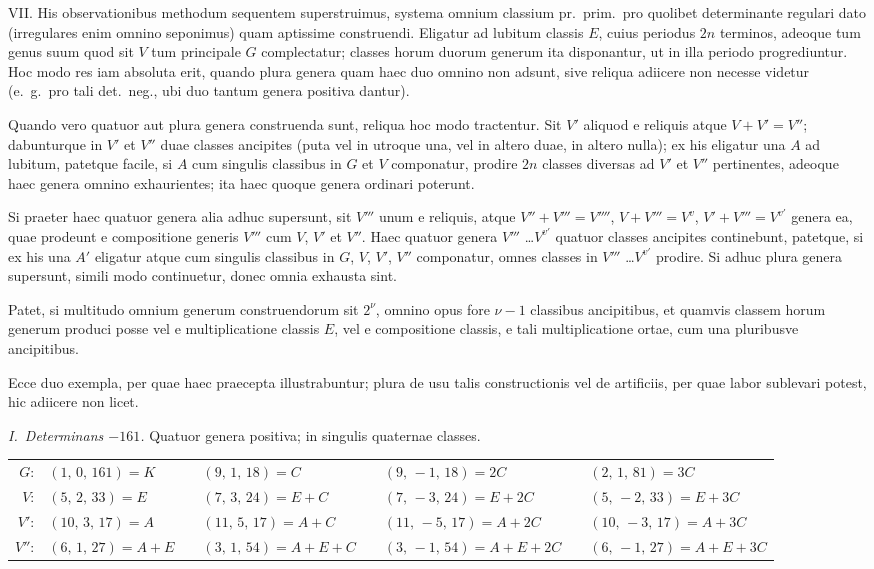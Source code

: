 \documentclass[12pt,a4paper]{article}
\theoremstyle{plain}
\theoremstyle{definition}
\theoremstyle{remark}
\begin{document}
\textsc{VII.} His observationibus methodum sequentem superstruimus, systema omnium classium pr.~prim.~pro quolibet determinante regulari dato (irregulares enim omnino seponimus) quam aptissime construendi. Eligatur ad lubitum classis $E$, cuius periodus $2n$ terminos, adeoque tum genus suum quod sit $V$ tum principale $G$ complectatur; classes horum duorum generum ita disponantur, ut in illa periodo progrediuntur. Hoc modo res iam absoluta erit, quando plura genera quam haec duo omnino non adsunt, sive reliqua adiicere non necesse videtur (e.~g.~pro tali det.~neg., ubi duo tantum genera positiva dantur).

Quando vero quatuor aut plura genera construenda sunt, reliqua hoc modo tractentur. Sit $V'$ aliquod e reliquis atque $V+V' = V''$; dabunturque in $V'$ et $V''$ duae classes ancipites (puta vel in utroque una, vel in altero duae, in altero nulla); ex his eligatur una $A$ ad lubitum, patetque facile, si $A$ cum singulis classibus in $G$ et $V$ componatur, prodire $2n$ classes diversas ad $V'$ et $V''$ pertinentes, adeoque haec genera omnino exhaurientes; ita haec quoque genera ordinari poterunt.

Si praeter haec quatuor genera alia adhuc supersunt, sit $V'''$ unum e reliquis, atque $V''+V''' = V''''$, $V+V''' = V^{v}$, $V'+V''' = V^{v'}$ genera ea, quae prodeunt e compositione generis $V'''$ cum $V$, $V'$ et $V''$. Haec quatuor genera $V'''$ \ldots $V^{v'}$ quatuor classes ancipites continebunt, patetque, si ex his una $A'$ eligatur atque cum singulis classibus in $G$, $V$, $V'$, $V''$ componatur, omnes classes in $V'''$ \ldots $V^{v'}$ prodire. Si adhuc plura genera supersunt, simili modo continuetur, donec omnia exhausta sint.

Patet, si multitudo omnium generum construendorum sit $2^\nu$, omnino opus fore $\nu-1$ classibus ancipitibus, et quamvis classem horum generum produci posse vel e multiplicatione classis $E$, vel e compositione classis, e tali multiplicatione ortae, cum una pluribusve ancipitibus.

Ecce duo exempla, per quae haec praecepta illustrabuntur; plura de usu talis constructionis vel de artificiis, per quae labor sublevari potest, hic adiicere non licet.

\textit{I.~Determinans $-161$.} Quatuor genera positiva; in singulis quaternae classes.

\begin{center}
\begin{tabular}{r@{\,}l@{\qquad}r@{\,}l@{\qquad}r@{\,}l@{\qquad}r@{\,}l}
$G$: & $(1,\,0,\,161) = K$ & & $(9,\,1,\,18) = C$ & & $(9,\,-1,\,18) = 2C$ & & $(2,\,1,\,81) = 3C$ \\
$V$: & $(5,\,2,\,33) = E$ & & $(7,\,3,\,24) = E+C$ & & $(7,\,-3,\,24) = E+2C$ & & $(5,\,-2,\,33) = E+3C$ \\
$V'$: & $(10,\,3,\,17) = A$ & & $(11,\,5,\,17) = A+C$ & & $(11,\,-5,\,17) = A+2C$ & & $(10,\,-3,\,17) = A+3C$ \\
$V''$: & $(6,\,1,\,27) = A+E$ & & $(3,\,1,\,54) = A+E+C$ & & $(3,\,-1,\,54) = A+E+2C$ & & $(6,\,-1,\,27) = A+E+3C$
\end{tabular}
\end{center}
\end{document}
